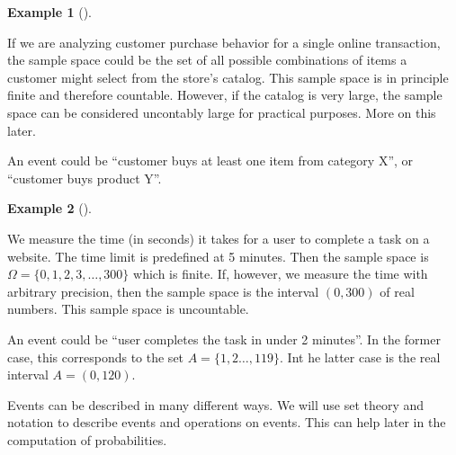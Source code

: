 \documentclass[
  letterpaper,
  DIV=11,
  numbers=noendperiod]{scrreport}
\theoremstyle{definition}
\newtheorem{example}{Example}[chapter]
\theoremstyle{plain}
\theoremstyle{plain}
\theoremstyle{definition}
\theoremstyle{remark}
\begin{document}
\begin{example}[]\protect\hypertarget{exm-2-1.1}{}\label{exm-2-1.1}

If we are analyzing customer purchase behavior for a single online
transaction, the sample space could be the set of all possible
combinations of items a customer might select from the store's catalog.
This sample space is in principle finite and therefore countable.
However, if the catalog is very large, the sample space can be
considered uncontably large for practical purposes. More on this later.

An event could be ``customer buys at least one item from category X'',
or ``customer buys product Y''.

\end{example}

\begin{example}[]\protect\hypertarget{exm-3-1.1}{}\label{exm-3-1.1}

We measure the time (in seconds) it takes for a user to complete a task
on a website. The time limit is predefined at 5 minutes. Then the sample
space is \(\Omega = \{0, 1, 2, 3,\ldots, 300\}\) which is finite. If,
however, we measure the time with arbitrary precision, then the sample
space is the interval \((0,300)\) of real numbers. This sample space is
uncountable.

An event could be ``user completes the task in under 2 minutes''. In the
former case, this corresponds to the set \(A=\{1,2\ldots, 119 \}\). Int
he latter case is the real interval \(A=(0, 120)\).

\end{example}

Events can be described in many different ways. We will use set theory
and notation to describe events and operations on events. This can help
later in the computation of probabilities.
\end{document}
